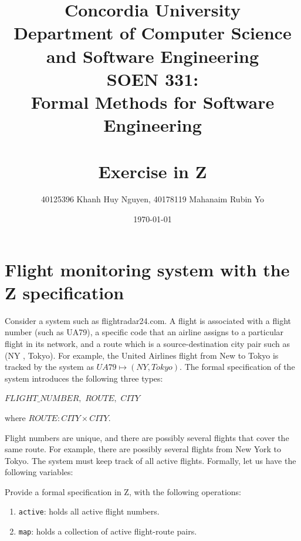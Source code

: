 \documentclass[12pt]{article}
\title{Concordia University\\
Department of Computer Science and Software Engineering\\
\textbf{SOEN 331:\\Formal Methods for Software Engineering}\\
\ \\
\textbf{Exercise in Z}}
\author{40125396 Khanh Huy Nguyen, 40178119 Mahanaim Rubin Yo}
\date{\today}
\begin{document}
\maketitle

\newpage

\section*{Flight monitoring system with the Z specification}

Consider a system such as flightradar24.com. A flight is associated with a flight number
(such as UA79), a specific code that an airline assigns to a particular flight in its network,
and a route which is a source-destination city pair such as (NY , Tokyo). For example, the
United Airlines flight from New to Tokyo is tracked by the system as $ UA79 \mapsto (NY , Tokyo) .$
The formal specification of the system introduces the following three types:

\indent \(FLIGHT\_NUMBER,\)
\newline \indent \(ROUTE,\)
\newline \indent \(CITY \)

\noindent where
\newline \indent $ROUTE: CITY \times CITY$.

\noindent Flight numbers are unique, and there are possibly several flights that cover the same route.
For example, there are possibly several flights from New York to Tokyo. The system must
keep track of all active flights. Formally, let us have the following variables:

\noindent Provide a formal specification in Z, with the following operations:

\begin{enumerate}
	\item \texttt{active}:  holds all active flight numbers.
	\item \texttt{map}: holds a collection of active flight-route pairs.

\end{enumerate}

\newpage
\end{document}
